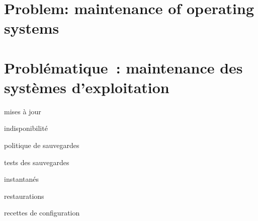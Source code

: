 \ml
{\chapter{Problem: maintenance of operating systems}}
{\chapter{Problématique : maintenance des systèmes d’exploitation}}

\begin{itmz}
\item{
{mises à jour}}
\item{
{indisponibilité}}
\item{
{politique de sauvegardes}}
\item{
{tests des sauvegardes}}
\item{
{instantanés}}
\item{
{restaurations}}
\item{
{recettes de configuration}}
\end{itmz}




